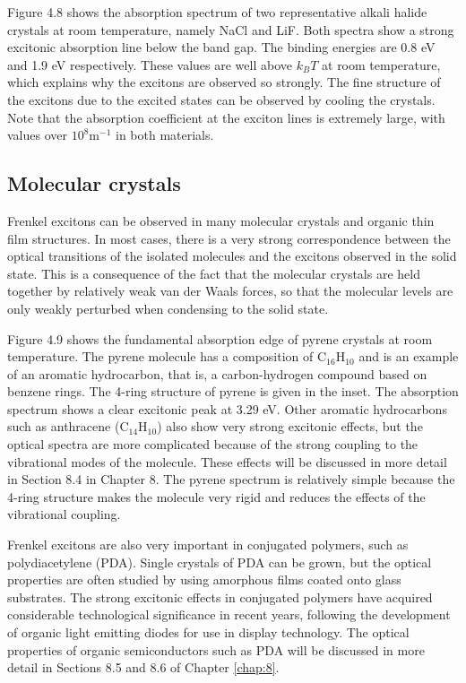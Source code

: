 \documentclass[12pt]{book}
\begin{document}
Figure 4.8 shows the absorption spectrum of two representative alkali halide crystals at room temperature, namely NaCl and LiF. Both spectra show a strong excitonic absorption line below the band gap. The binding energies are 0.8 eV and 1.9 eV respectively. These values are well above $k_BT$ at room temperature, which explains why the excitons are observed so strongly. The fine structure of the excitons due to the excited states can be observed by cooling the crystals. Note that the absorption coefficient at the exciton lines is extremely large, with values over $10^8\mathrm{m}^{-1}$ in both materials.

\subsection{Molecular crystals}
Frenkel excitons can be observed in many molecular crystals and organic thin film structures. In most cases, there is a very strong correspondence between the optical transitions of the isolated molecules and the excitons observed in the solid state. This is a consequence of the fact that the molecular crystals are held together by relatively weak van der Waals forces, so that the molecular levels are only weakly perturbed when condensing to the solid state.

Figure 4.9 shows the fundamental absorption edge of pyrene crystals at room temperature. The pyrene molecule has a composition of $\mathrm{C_{16}H_{10}}$ and is an example of an aromatic hydrocarbon, that is, a carbon-hydrogen compound based on benzene rings. The 4-ring structure of pyrene is given in the inset. The absorption spectrum shows a clear excitonic peak at 3.29 eV. Other aromatic hydrocarbons such as anthracene ($\mathrm{C_{14}H_{10}}$) also show very strong excitonic effects, but the optical spectra are more complicated because of the strong coupling to the vibrational modes of the molecule. These effects will be discussed in more detail in Section 8.4 in Chapter 8. The pyrene spectrum is relatively simple because the 4-ring structure makes the molecule very rigid and reduces the effects of the vibrational coupling.

Frenkel excitons are also very important in conjugated polymers, such as polydiacetylene (PDA). Single crystals of PDA can be grown, but the optical properties are often studied by using amorphous films coated onto glass substrates. The strong excitonic effects in conjugated polymers have acquired considerable technological significance in recent years, following the development of organic light emitting diodes for use in display technology. The optical properties of organic semiconductors such as PDA will be discussed in more detail in Sections 8.5 and 8.6 of Chapter \ref{chap:8}.
\end{document}
